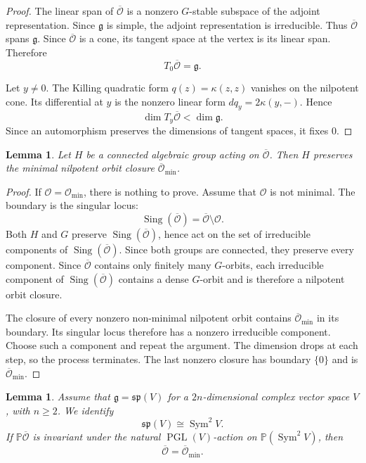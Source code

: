 \documentclass[10pt,a4paper]{amsart}
\newtheorem{lemma}[theorem]{Lemma}
\DeclareMathOperator{\Sing}{Sing}
\DeclareMathOperator{\Sym}{Sym}
\begin{document}
\begin{proof}
The linear span of $\overline{\mathcal O}$ is a nonzero
$G$-stable subspace of the adjoint representation.
Since $\mathfrak g$ is simple, the adjoint representation is
irreducible. Thus $\overline{\mathcal O}$ spans $\mathfrak g$.
Since $\overline{\mathcal O}$ is a cone, its tangent space at the
vertex is its linear span. Therefore
\[
T_0\overline{\mathcal O}=\mathfrak g.
\]

Let $y\ne0$.
The Killing quadratic form $q(z)=\kappa(z,z)$ vanishes on the
nilpotent cone. Its differential at $y$ is the nonzero linear form
$dq_y=2\kappa(y,-)$.
Hence
\[
\dim T_y\overline{\mathcal O}<\dim\mathfrak g.
\]
Since an automorphism preserves the dimensions of tangent spaces, it
fixes $0$.
\end{proof}

\begin{lemma}\label{lem:minimal-preserved}
Let $H$ be a connected algebraic group acting on
$\overline{\mathcal O}$.
Then $H$ preserves the minimal nilpotent orbit closure
$\overline{\mathcal O}_{\min}$.
\end{lemma}

\begin{proof}
If $\mathcal O=\mathcal O_{\min}$, there is nothing to prove. Assume
that $\mathcal O$ is not minimal. The boundary is the singular locus:
\[
\Sing(\overline{\mathcal O})
=\overline{\mathcal O}\setminus\mathcal O.
\]
Both $H$ and $G$ preserve
$\Sing(\overline{\mathcal O})$, hence act on the set of irreducible
components of $\Sing(\overline{\mathcal O})$.
Since both groups are connected, they preserve every component.
Since $\overline{\mathcal O}$ contains only finitely many $G$-orbits,
each irreducible component of $\Sing(\overline{\mathcal O})$ contains
a dense $G$-orbit and is therefore a nilpotent orbit closure.

The closure of every nonzero non-minimal nilpotent orbit contains
$\overline{\mathcal O}_{\min}$ in its boundary.
Its singular locus therefore has a nonzero irreducible component.
Choose such a component and repeat the argument.
The dimension drops at each step, so the process terminates.
The last nonzero closure has boundary $\{0\}$ and is
$\overline{\mathcal O}_{\min}$.
\end{proof}

\begin{lemma}\label{lem:sp-pgl}
Assume that $\mathfrak g=\mathfrak{sp}(V)$ for a $2n$-dimensional
complex vector space $V$, with $n\geq2$.
We identify
\[
\mathfrak{sp}(V)\cong\Sym^2V.
\]
If $\mathbb P\overline{\mathcal O}$ is invariant under the natural
$\operatorname{PGL}(V)$-action on $\mathbb P(\Sym^2V)$, then
\[
\overline{\mathcal O}=\overline{\mathcal O}_{\min}.
\]
\end{lemma}
\end{document}
